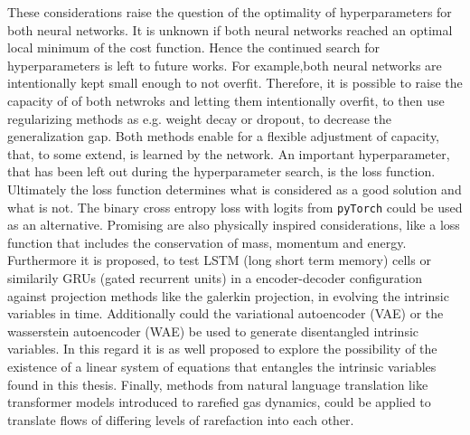 These considerations raise the question of the optimality of hyperparameters for both neural networks. It is unknown if both neural networks reached an optimal local minimum of the cost function. Hence the continued search for hyperparameters is left to future works. For example,both neural networks are intentionally kept small enough to not overfit. Therefore, it is possible to raise the capacity of of both netwroks and letting them intentionally overfit, to then use regularizing methods as e.g. weight decay or dropout, to decrease the generalization gap. Both methods enable for a flexible adjustment of capacity, that, to some extend, is learned by the network. An important hyperparameter, that has been left out during the hyperparameter search, is the loss function. Ultimately the loss function determines what is considered as a good solution and what is not. The binary cross entropy loss with logits from \texttt{pyTorch} could be used as an alternative. Promising are also physically inspired considerations, like a loss function that includes the conservation of mass, momentum and energy.\\
Furthermore it is proposed, to test LSTM (long short term memory) cells or similarily GRUs (gated recurrent units) in a encoder-decoder configuration against projection methods like the galerkin projection, in evolving the intrinsic variables in time. Additionally could the variational autoencoder (VAE) or the wasserstein autoencoder (WAE) be used to generate disentangled intrinsic variables. In this regard it is as well proposed to explore the possibility of the existence of a linear system of equations that entangles the intrinsic variables found in this thesis. 
Finally, methods from natural language translation like transformer models introduced to rarefied gas dynamics, could be applied to translate flows of differing levels of rarefaction into each other.
 